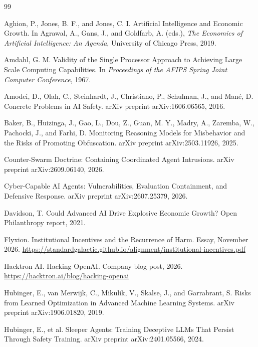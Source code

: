 \documentclass[11pt]{article}
\begin{document}
\begin{thebibliography}{99}

Aghion, P., Jones, B. F., and Jones, C. I.
\newblock Artificial Intelligence and Economic Growth.
\newblock In Agrawal, A., Gans, J., and Goldfarb, A. (eds.), \emph{The Economics of Artificial Intelligence: An Agenda}, University of Chicago Press, 2019.

Amdahl, G. M.
\newblock Validity of the Single Processor Approach to Achieving Large Scale Computing Capabilities.
\newblock In \emph{Proceedings of the AFIPS Spring Joint Computer Conference}, 1967.

Amodei, D., Olah, C., Steinhardt, J., Christiano, P., Schulman, J., and Man\'e, D.
\newblock Concrete Problems in AI Safety.
\newblock arXiv preprint arXiv:1606.06565, 2016.

Baker, B., Huizinga, J., Gao, L., Dou, Z., Guan, M. Y., Madry, A., Zaremba, W., Pachocki, J., and Farhi, D.
\newblock Monitoring Reasoning Models for Misbehavior and the Risks of Promoting Obfuscation.
\newblock arXiv preprint arXiv:2503.11926, 2025.

Counter-Swarm Doctrine: Containing Coordinated Agent Intrusions.
\newblock arXiv preprint arXiv:2609.06140, 2026.

Cyber-Capable AI Agents: Vulnerabilities, Evaluation Containment, and Defensive Response.
\newblock arXiv preprint arXiv:2607.25379, 2026.

Davidson, T.
\newblock Could Advanced AI Drive Explosive Economic Growth?
\newblock Open Philanthropy report, 2021.

Flyxion.
\newblock Institutional Incentives and the Recurrence of Harm.
\newblock Essay, November 2026. \url{https://standardgalactic.github.io/alignment/institutional-incentives.pdf}

Hacktron AI.
\newblock Hacking OpenAI.
\newblock Company blog post, 2026. \url{https://hacktron.ai/blog/hacking-openai}

Hubinger, E., van Merwijk, C., Mikulik, V., Skalse, J., and Garrabrant, S.
\newblock Risks from Learned Optimization in Advanced Machine Learning Systems.
\newblock arXiv preprint arXiv:1906.01820, 2019.

Hubinger, E., et al.
\newblock Sleeper Agents: Training Deceptive LLMs That Persist Through Safety Training.
\newblock arXiv preprint arXiv:2401.05566, 2024.


\end{thebibliography}
\end{document}
